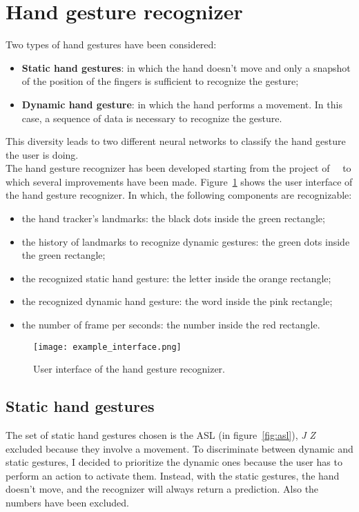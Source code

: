 \documentclass[../thesis.tex]{subfiles}
\begin{document}
\section{Hand gesture recognizer}
Two types of hand gestures have been considered:
\begin{itemize}
    \item \textbf{Static hand gestures}: in which the hand doesn't move and only a snapshot of the position of the fingers is sufficient to recognize the gesture;
    \item \textbf{Dynamic hand gesture}: in which the hand performs a movement. In this case, a sequence of data is necessary to recognize the gesture. 
\end{itemize}
This diversity leads to two different neural networks to classify the hand gesture the user is doing.\\
The hand gesture recognizer has been developed starting from the project of~\citeauthor{site:hand_gesture_base_repo}~\cite{site:hand_gesture_base_repo} to which several improvements have been made. Figure~\ref{fig:interface} shows the user interface of the hand gesture recognizer. In which, the following components are recognizable:
\begin{itemize}
    \item the hand tracker's landmarks: the black dots inside the green rectangle;
    \item the history of landmarks to recognize dynamic gestures: the green dots inside the green rectangle;
    \item the recognized static hand gesture: the letter inside the orange rectangle;
    \item the recognized dynamic hand gesture: the word inside the pink rectangle;
    \item the number of frame per seconds: the number inside the red rectangle.
\end{itemize}

\begin{figure}[H]
    \centering
    \texttt{[image: example\_interface.png]}
    \caption{User interface of the hand gesture recognizer.}\label{fig:interface}
\end{figure}

\subsection{Static hand gestures}
The set of static hand gestures chosen is the \gls{ASL} (in figure~\ref{fig:asl}), \textit{J} \textit{Z} excluded because they involve a movement. To discriminate between dynamic and static gestures, I decided to prioritize the dynamic ones because the user has to perform an action to activate them. Instead, with the static gestures, the hand doesn't move, and the recognizer will always return a prediction. Also the numbers have been excluded.
\end{document}
